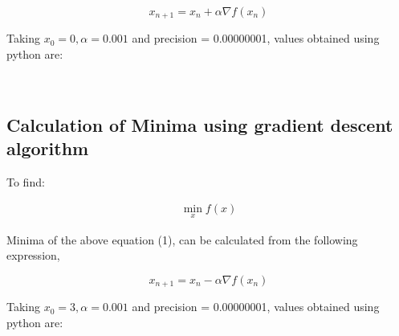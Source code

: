\documentclass[10pt,twocolumn]{article}
\begin{document}
    \begin{equation}
        x_{n+1}= x_n + \alpha \nabla f(x_n)
    \end{equation}
\begin{flushleft}
Taking $x_0=0,\alpha=0.001$ and precision = 0.00000001, values obtained using python are:
\end{flushleft} 
\center
        \\
        \vspace{0.45cm}
\endcenter
\begin{flushleft}
\subsection{Calculation of Minima using gradient descent algorithm}
\end{flushleft}
\begin{flushleft}
To find:
\end{flushleft}
\begin{align}
\min_{x} f(x)
\end{align}  
\begin{flushleft}
Minima of the above equation (1), can be calculated from the following expression,\\
\end{flushleft}
    \begin{equation}
        x_{n+1}= x_n - \alpha \nabla f(x_n) 
    \end{equation}
\begin{flushleft}
Taking $x_0=3,\alpha=0.001$ and precision = 0.00000001, values obtained using python are:
\end{flushleft}
\center
        \\
        \vspace{0.45cm}
\endcenter
\end{document}
